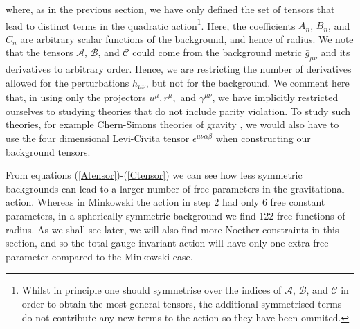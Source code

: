 \documentclass[10pt,twocolumn,preprintnumbers,amsmath,amssymb,nofootinbib
,superscriptaddress]{revtex4-1}
\begin{document}
where, as in the previous section, we have only defined the set of tensors that lead to distinct terms in the quadratic action\footnote{Whilst in principle one should symmetrise over the indices of $\mathcal{A}$, $\mathcal{B}$, and $\mathcal{C}$ in order to obtain the most general tensors, the additional symmetrised terms do not contribute any new terms to the action so they have been ommited.}. Here, the coefficients $A_n$, $B_n$, and $C_n$ are arbitrary scalar functions of the background, and hence of radius. We note that the tensors $\mathcal{A}$, $\mathcal{B}$, and $\mathcal{C}$ could come from the background metric $\bar{g}_{\mu\nu}$ and its derivatives to arbitrary order. Hence, we are restricting the number of derivatives allowed for the perturbations $h_{\mu\nu}$, but not for the background. We comment here that, in using only the projectors $u^\mu, r^\mu,$ and $\gamma^{\mu\nu}$, we have implicitly restricted ourselves to studying theories that do not include parity violation. To study such theories, for example Chern-Simons theories of gravity \cite{Alexander:2009tp}, we would also have to use the four dimensional Levi-Civita tensor $\epsilon^{\mu\nu\alpha\beta}$ when constructing our background tensors. 

From equations (\ref{Atensor})-(\ref{Ctensor}) we can see how less symmetric backgrounds can lead to a larger number of free parameters in the gravitational action. Whereas in Minkowski the action in step 2 had only 6 free constant parameters, in a spherically symmetric background we find 122 free functions of radius. As we shall see later, we will also find more Noether constraints in this section, and so the total gauge invariant action will have only one extra free parameter compared to the Minkowski case.
\end{document}
